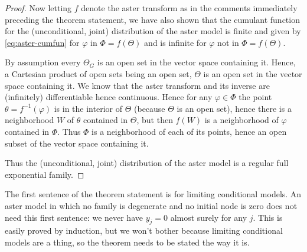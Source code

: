\begin{proof}
Now letting $f$ denote the aster transform as in the comments immediately
preceding the theorem statement, we have also shown that
the cumulant function for the (unconditional, joint) distribution of
the aster model is finite and given by \eqref{eq:aster-cumfun} for
$\varphi$ in $\Phi = f(\Theta)$ and is infinite for
$\varphi$ not in $\Phi = f(\Theta)$.

By assumption every $\Theta_G$ is an open set in the vector space
containing it.  Hence, a Cartesian product of open sets being an open set,
$\Theta$ is an open set in the vector space containing it.
We know that the aster transform and its inverse are (infinitely)
differentiable hence continuous.  Hence for any $\varphi \in \Phi$
the point $\theta = f^{-1}(\varphi)$ is in the interior of $\Theta$
(because $\Theta$ is an open set), hence there is a neighborhood $W$
of $\theta$ contained in $\Theta$, but then $f(W)$ is a neighborhood of
$\varphi$ contained in $\Phi$.  Thus $\Phi$ is a neighborhood of each
of its points, hence an open subset of the vector space containing it.

Thus the (unconditional, joint) distribution of the aster model
is a regular full exponential family.
\end{proof}

The first sentence of the theorem statement is for limiting conditional
models.
An aster model in which no family is degenerate and no initial node is zero
does not need this first sentence: we never have $y_j = 0$ almost surely
for any $j$.  This is easily proved by induction, but we won't bother
because limiting conditional models are a thing, so the theorem needs
to be stated the way it is.
